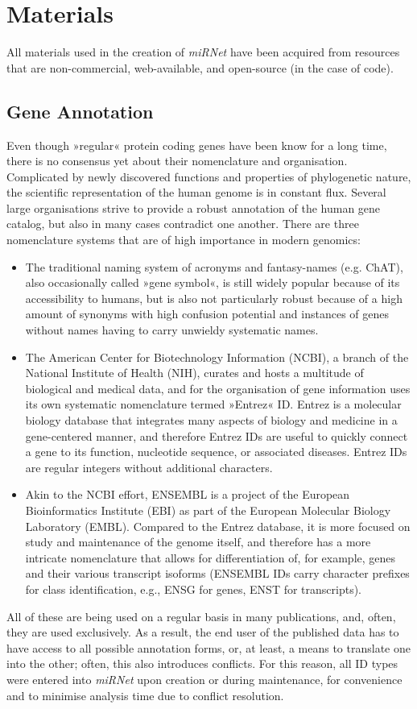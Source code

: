 \section{Materials}
All materials used in the creation of \textit{miRNet} have been acquired from resources that are non-commercial, web-available, and open-source (in the case of code).

\subsection{Gene Annotation}
Even though »regular« protein coding genes have been know for a long time, there is no consensus yet about their nomenclature and organisation. Complicated by newly discovered functions and properties of phylogenetic nature, the scientific representation of the human genome is in constant flux. Several large organisations strive to provide a robust annotation of the human gene catalog, but also in many cases contradict one another. There are three nomenclature systems that are of high importance in modern genomics: 
\begin{itemize}
\item The traditional naming system of acronyms and fantasy-names (e.g. ChAT), also occasionally called »gene symbol«, is still widely popular because of its accessibility to humans, but is also not particularly robust because of a high amount of synonyms with high confusion potential and instances of genes without names having to carry unwieldy systematic names.
\item The American Center for Biotechnology Information (NCBI), a branch of the National Institute of Health (NIH), curates and hosts a multitude of biological and medical data, and for the organisation of gene information uses its own systematic nomenclature termed »Entrez« ID. Entrez is a molecular biology database that integrates many aspects of biology and medicine in a gene-centered manner, and therefore Entrez IDs are useful to quickly connect a gene to its function, nucleotide sequence, or associated diseases. Entrez IDs are regular integers without additional characters.
\item Akin to the NCBI effort, ENSEMBL is a project of the European Bioinformatics Institute (EBI) as part of the European Molecular Biology Laboratory (EMBL). Compared to the Entrez database, it is more focused on study and maintenance of the genome itself, and therefore has a more intricate nomenclature that allows for differentiation of, for example, genes and their various transcript isoforms (ENSEMBL IDs carry character prefixes for class identification, e.g., ENSG for genes, ENST for transcripts).
\end{itemize}
All of these are being used on a regular basis in many publications, and, often, they are used exclusively. As a result, the end user of the published data has to have access to all possible annotation forms, or, at least, a means to translate one into the other; often, this also introduces conflicts. For this reason, all ID types were entered into \textit{miRNet} upon creation or during maintenance, for convenience and to minimise analysis time due to conflict resolution.

